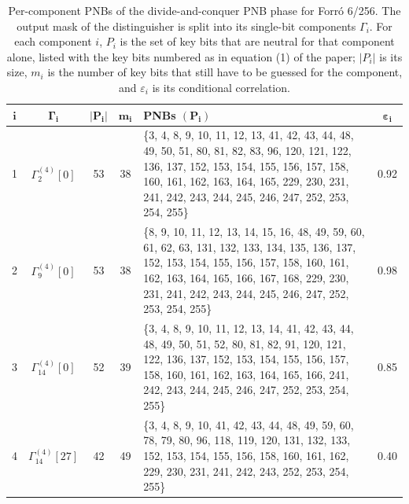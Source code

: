 \documentclass[a4paper]{article}
\newlength{\oprule}\setlength{\oprule}{0.7pt}
\newcommand{\Forro}{Forr\'o\xspace}
\begin{document}
\begin{table}[H]
\centering
\renewcommand{\arraystretch}{1.6}
\setlength{\tabcolsep}{8pt}
\caption{Per-component PNBs of the divide-and-conquer PNB phase for \Forro 6/256. The output mask of the distinguisher is split into its single-bit components $\Gamma_i$. For each component $i$, $P_i$ is the set of key bits that are neutral for that component alone, listed with the key bits numbered as in equation (1) of the paper; $|P_i|$ is its size, $m_i$ is the number of key bits that still have to be guessed for the component, and $\varepsilon_i$ is its conditional correlation.}
\label{app:pnbtab-6}
\begin{tabular}{@{}cccc p{8cm} c@{}}
\toprule
$\boldsymbol{i}$ & $\boldsymbol{\Gamma_i}$ & $\boldsymbol{|P_i|}$ & $\boldsymbol{m_i}$ & \textbf{PNBs $(\boldsymbol{P_i})$} & $\boldsymbol{\varepsilon_i}$ \\
\midrule
1 & $\Gamma^{(4)}_{2}[0]$ & 53 & 38 &
\{3, 4, 8, 9, 10, 11, 12, 13, 41, 42, 43, 44, 48, 49, 50, 51, 80, 81, 82, 83, 96, 120, 121, 122, 136, 137, 152, 153, 154, 155, 156, 157, 158, 160, 161, 162, 163, 164, 165, 229, 230, 231, 241, 242, 243, 244, 245, 246, 247, 252, 253, 254, 255\} & 0.92 \\
\midrule
2 & $\Gamma^{(4)}_{9}[0]$ & 53 & 38 &
\{8, 9, 10, 11, 12, 13, 14, 15, 16, 48, 49, 59, 60, 61, 62, 63, 131, 132, 133, 134, 135, 136, 137, 152, 153, 154, 155, 156, 157, 158, 160, 161, 162, 163, 164, 165, 166, 167, 168, 229, 230, 231, 241, 242, 243, 244, 245, 246, 247, 252, 253, 254, 255\} & 0.98 \\
\midrule
3 & $\Gamma^{(4)}_{14}[0]$ & 52 & 39 &
\{3, 4, 8, 9, 10, 11, 12, 13, 14, 41, 42, 43, 44, 48, 49, 50, 51, 52, 80, 81, 82, 91, 120, 121, 122, 136, 137, 152, 153, 154, 155, 156, 157, 158, 160, 161, 162, 163, 164, 165, 166, 241, 242, 243, 244, 245, 246, 247, 252, 253, 254, 255\} & 0.85 \\
\midrule
4 & $\Gamma^{(4)}_{14}[27]$ & 42 & 49 &
\{3, 4, 8, 9, 10, 41, 42, 43, 44, 48, 49, 59, 60, 78, 79, 80, 96, 118, 119, 120, 131, 132, 133, 152, 153, 154, 155, 156, 158, 160, 161, 162, 229, 230, 231, 241, 242, 243, 252, 253, 254, 255\} & 0.40 \\
\bottomrule
\end{tabular}
\end{table}
\end{document}
